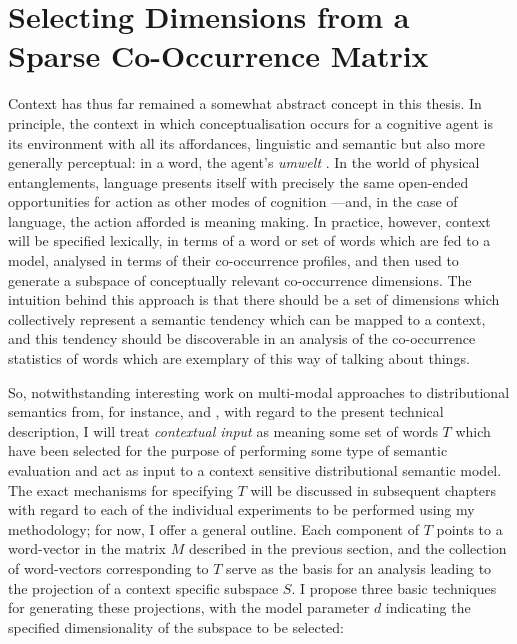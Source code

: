 \section{Selecting Dimensions from a Sparse Co-Occurrence Matrix}
Context has thus far remained a somewhat abstract concept in this thesis.  In principle, the context in which conceptualisation occurs for a cognitive agent is its environment with all its affordances, linguistic and semantic but also more generally perceptual: in a word, the agent's \emph{umwelt} \citep{VonUexkull1957}.  In the world of physical entanglements, language presents itself with precisely the same open-ended opportunities for action as other modes of cognition \citep{Gibson1979,Clark1997}---and, in the case of language, the action afforded is meaning making.  In practice, however, context will be specified lexically, in terms of a word or set of words which are fed to a model, analysed in terms of their co-occurrence profiles, and then used to generate a subspace of conceptually relevant co-occurrence dimensions.  The intuition behind this approach is that there should be a set of dimensions which collectively represent a semantic tendency which can be mapped to a context, and this tendency should be discoverable in an analysis of the co-occurrence statistics of words which are exemplary of this way of talking about things.


So, notwithstanding interesting work on multi-modal approaches to distributional semantics from, for instance, \cite{HillEA2014} and \cite{BruniEA2014}, with regard to the present technical description, I will treat \emph{contextual input} as meaning some set of words $T$ which have been selected for the purpose of performing some type of semantic evaluation and act as input to a context sensitive distributional semantic model.  The exact mechanisms for specifying $T$ will be discussed in subsequent chapters with regard to each of the individual experiments to be performed using my methodology; for now, I offer a general outline.  Each component of $T$ points to a word-vector in the matrix $M$ described in the previous section, and the collection of word-vectors corresponding to $T$ serve as the basis for an analysis leading to the projection of a context specific subspace $S$.  I propose three basic techniques for generating these projections, with the model parameter $d$ indicating the specified dimensionality of the subspace to be selected:

